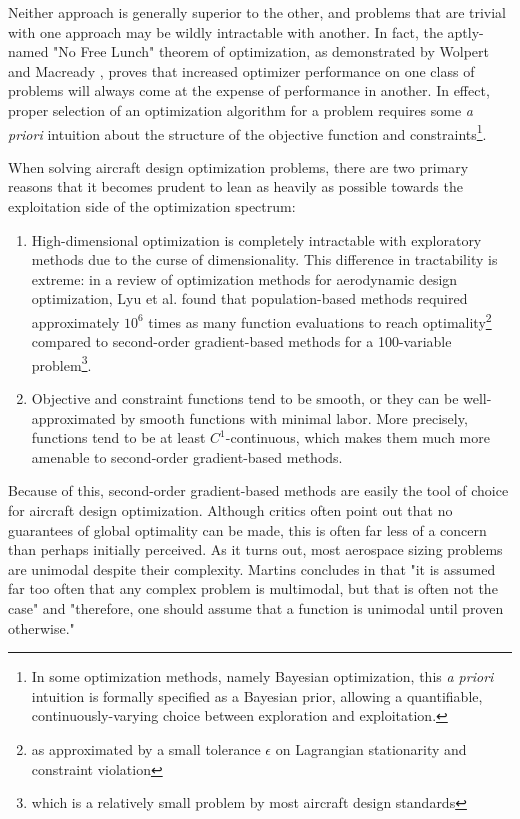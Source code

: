 Neither approach is generally superior to the other, and problems that are trivial with one approach may be wildly intractable with another. In fact, the aptly-named "No Free Lunch" theorem of optimization, as demonstrated by Wolpert and Macready \cite{Wolpert1997}, proves that increased optimizer performance on one class of problems will always come at the expense of performance in another. In effect, proper selection of an optimization algorithm for a problem requires some \textit{a priori} intuition about the structure of the objective function and constraints\footnote{In some optimization methods, namely Bayesian optimization, this \textit{a priori} intuition is formally specified as a Bayesian prior, allowing a quantifiable, continuously-varying choice between exploration and exploitation.}.

When solving aircraft design optimization problems, there are two primary reasons that it becomes prudent to lean as heavily as possible towards the exploitation side of the optimization spectrum:

\begin{enumerate}
    \item High-dimensional optimization is completely intractable with exploratory methods due to the curse of dimensionality. This difference in tractability is extreme: in a review of optimization methods for aerodynamic design optimization, Lyu et al. found that population-based methods required approximately $10^6$ times as many function evaluations to reach optimality\footnote{as approximated by a small tolerance $\epsilon$ on Lagrangian stationarity and constraint violation} compared to second-order gradient-based methods \cite{lyu2014} for a 100-variable problem\footnote{which is a relatively small problem by most aircraft design standards}.

    \item Objective and constraint functions tend to be smooth, or they can be well-approximated by smooth functions with minimal labor. More precisely, functions tend to be at least $C^1$-continuous, which makes them much more amenable to second-order gradient-based methods.
\end{enumerate}

Because of this, second-order gradient-based methods are easily the tool of choice for aircraft design optimization. Although critics often point out that no guarantees of global optimality can be made, this is often far less of a concern than perhaps initially perceived. As it turns out, most aerospace sizing problems are unimodal despite their complexity. Martins concludes in \cite{mdobook} that "it is assumed far too often that any complex problem is multimodal, but that is often not the case" and "therefore, one should assume that a function is unimodal until proven otherwise."


